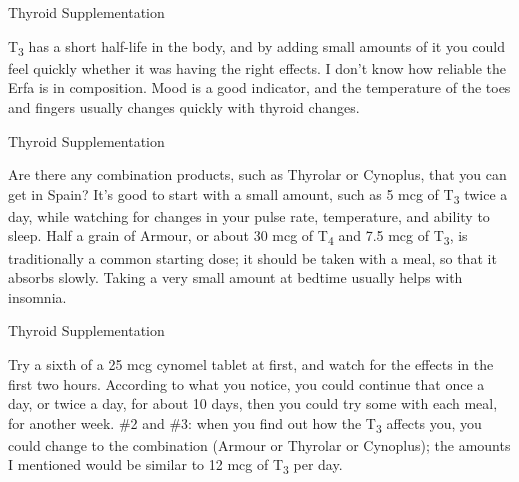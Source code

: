 \documentclass[11pt,oneside,openany,extrafontsizes]{memoir}
\begin{document}
\begin{standalonequote}{Thyroid Supplementation}

    \begin{answer}
        T\textsubscript{3} has a short half-life in the body, and by adding small amounts of it you could feel quickly whether it was having the right effects. I don't know how reliable the Erfa is in composition. Mood is a good indicator, and the temperature of the toes and fingers usually changes quickly with thyroid changes.
    \end{answer}
\end{standalonequote}

\begin{standalonequote}{Thyroid Supplementation}

    \begin{answer}
        Are there any combination products, such as Thyrolar or Cynoplus, that you can get in Spain? It's good to start with a small amount, such as 5 mcg of T\textsubscript{3} twice a day, while watching for changes in your pulse rate, temperature, and ability to sleep. Half a grain of Armour, or about 30 mcg of T\textsubscript{4} and 7.5 mcg of T\textsubscript{3}, is traditionally a common starting dose; it should be taken with a meal, so that it absorbs slowly. Taking a very small amount at bedtime usually helps with insomnia.
    \end{answer}
\end{standalonequote}

\begin{standalonequote}{Thyroid Supplementation}

    \begin{answer}
        Try a sixth of a 25 mcg cynomel tablet at first, and watch for the effects in the first two hours. According to what you notice, you could continue that once a day, or twice a day, for about 10 days, then you could try some with each meal, for another week. \#2 and \#3: when you find out how the T\textsubscript{3} affects you, you could change to the combination (Armour or Thyrolar or Cynoplus); the amounts I mentioned would be similar to 12 mcg of T\textsubscript{3} per day.
    \end{answer}
\end{standalonequote}
\end{document}
